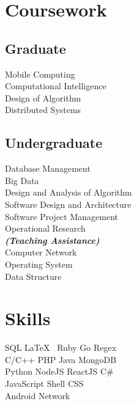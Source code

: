 \documentclass[letterpaper]{deedy-resume} %
\begin{document}
\begin{minipage}[t]{0.33\textwidth}

\section{Coursework}

\subsection{Graduate}
Mobile Computing \\
Computational Intelligence \\
Design of Algorithm \\
Distributed Systems \\
\sectionspace

\subsection{Undergraduate}
Database Management \\
Big Data \\
Design and Analysis of Algorithm \\
Software Design and Architecture \\
Software Project Management \\
Operational Research \\
{\footnotesize \textit{\textbf{(Teaching Assistance) }}} \\
Computer Network \\
Operating System \\
Data Structure
\sectionspace


\section{Skills}

SQL \textbullet{} \LaTeX\ \textbullet{} Ruby \textbullet{} Go \textbullet{} Regex \\
C/C++ \textbullet{} PHP \textbullet{} Java \textbullet{} MongoDB \\
Python \textbullet{} NodeJS \textbullet{} ReactJS \textbullet{} C\# \\
JavaScript \textbullet{} Shell \textbullet{} CSS \\
Android \textbullet{} Network
\sectionspace

\end{minipage} %
\end{document}
